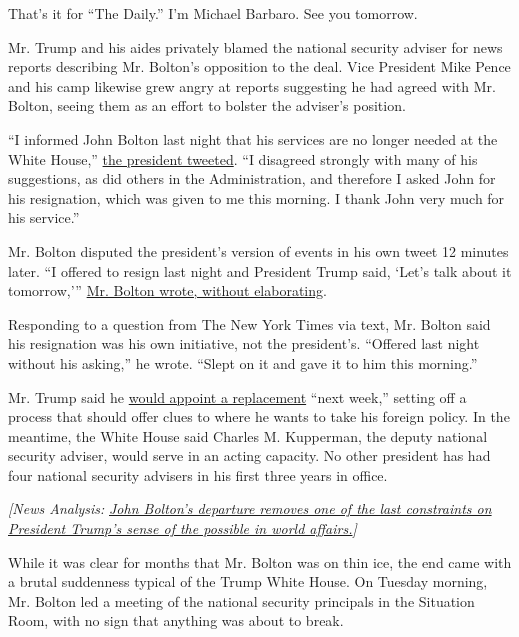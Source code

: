 That's it for ``The Daily.'' I'm Michael Barbaro. See you tomorrow.

Mr. Trump and his aides privately blamed the national security adviser
for news reports describing Mr. Bolton's opposition to the deal. Vice
President Mike Pence and his camp likewise grew angry at reports
suggesting he had agreed with Mr. Bolton, seeing them as an effort to
bolster the adviser's position.

``I informed John Bolton last night that his services are no longer
needed at the White House,''
\href{https://twitter.com/realDonaldTrump/status/1171452880055746560}{the
president tweeted}. ``I disagreed strongly with many of his suggestions,
as did others in the Administration, and therefore I asked John for his
resignation, which was given to me this morning. I thank John very much
for his service.''

Mr. Bolton disputed the president's version of events in his own tweet
12 minutes later. ``I offered to resign last night and President Trump
said, `Let's talk about it tomorrow,'''
\href{https://twitter.com/AmbJohnBolton/status/1171455806069305346}{Mr.
Bolton wrote, without elaborating}.

Responding to a question from The New York Times via text, Mr. Bolton
said his resignation was his own initiative, not the president's.
``Offered last night without his asking,'' he wrote. ``Slept on it and
gave it to him this morning.''

Mr. Trump said he
\href{https://www.nytimes.com/2019/09/10/us/john-bolton-replacement.html}{would
appoint a replacement} ``next week,'' setting off a process that should
offer clues to where he wants to take his foreign policy. In the
meantime, the White House said Charles M. Kupperman, the deputy national
security adviser, would serve in an acting capacity. No other president
has had four national security advisers in his first three years in
office.

\emph{{[}News Analysis:}
\href{https://www.nytimes.com/2019/09/10/us/politics/bolton-firing.html?action=click\&module=Intentional\&pgtype=Article}{\emph{John
Bolton's departure removes one of the last constraints on President
Trump's sense of the possible in world affairs.}}\emph{{]}}

While it was clear for months that Mr. Bolton was on thin ice, the end
came with a brutal suddenness typical of the Trump White House. On
Tuesday morning, Mr. Bolton led a meeting of the national security
principals in the Situation Room, with no sign that anything was about
to break.

